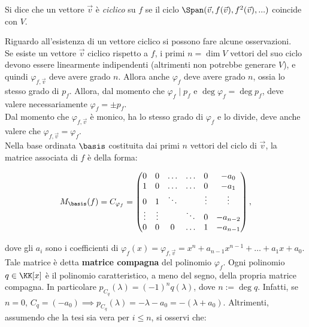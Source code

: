 \documentclass[11pt]{article}
\begin{document}
\begin{definition}
    Si dice che un vettore $\Vec{v}$ è \textit{ciclico} su $f$ se il ciclo
    $\Span(\vec{v}, f(\vec{v}), f^2(\Vec{v}), ...)$ coincide
    con $V$.
\end{definition}

\begin{remark}
    Riguardo all'esistenza di un vettore ciclico si possono
    fare alcune osservazioni. \\

    \li Se esiste un vettore $\vec{v}$ ciclico rispetto a $f$, i primi $n = \dim V$
    vettori del suo ciclo devono essere linearmente indipendenti
    (altrimenti non potrebbe generare $V$), e quindi $\varphi_{f,\Vec{v}}$ deve avere grado $n$. Allora
    anche $\varphi_f$ deve avere grado $n$, ossia lo stesso
    grado di $p_f$. Allora, dal momento che $\varphi_f \mid p_f$
    e $\deg \varphi_f = \deg p_f$, deve valere necessariamente
    $\varphi_f = \pm p_f$. \\
    \li Dal momento che $\varphi_{f,\Vec{v}}$ è monico, ha lo stesso grado
    di $\varphi_f$ e lo divide, deve anche valere che $\varphi_{f,\Vec{v}} = \varphi_f$. \\
    \li Nella base ordinata $\basis$ costituita dai primi $n$ vettori del ciclo di $\Vec{v}$, la matrice associata di $f$ è della forma:

    \[ M_{\basis}(f) = C_{\varphi_f} = \begin{pmatrix}
        0 & 0 & \ldots & \ldots & 0 & -a_0 \\
        1 & 0 & \ldots & \ldots & 0 & -a_1 \\
        0 & 1 & \ddots & & \vdots & \vdots \\
        \vdots & \vdots & & \ddots & 0 & -a_{n-2} \\
        0 & 0 & 0 & \ldots & 1 & -a_{n-1}
    \end{pmatrix}, \]

    dove gli $a_i$ sono i coefficienti di $\varphi_f(x) = \varphi_{f,\Vec{v}} = x^n + a_{n-1}x^{n-1} + \ldots + a_1 x + a_0$.
    Tale matrice è detta \textbf{matrice compagna} del polinomio $\varphi_f$.
    \li Ogni polinomio $q \in \KK[x]$ è il polinomio caratteristico, a meno del segno, della propria matrice compagna. In particolare $p_{C_q}(\lambda) = (-1)^n q(\lambda)$, dove $n := \deg q$. Infatti, se $n = 0$, $C_q = (-a_0) \implies p_{C_q}(\lambda)
    = -\lambda -a_0 = -(\lambda + a_0)$. Altrimenti, assumendo che la tesi sia vera per $i \leq n$, si osservi che:
    

\end{remark}
\end{document}
